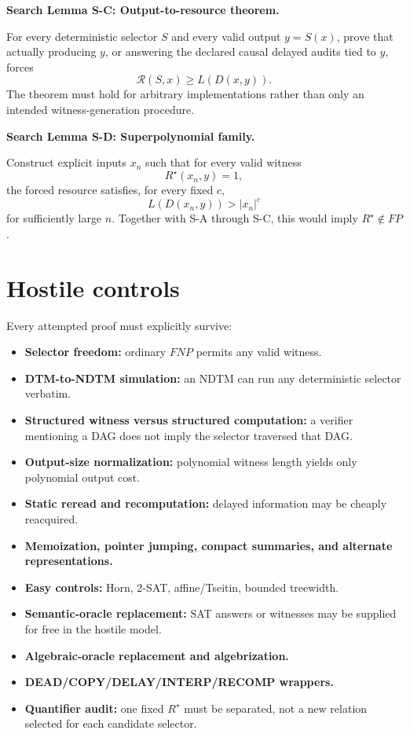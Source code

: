 \documentclass[11pt]{article}
\begin{document}
\begin{candidatebox}
\textbf{Search Lemma S-C: Output-to-resource theorem.}

For every deterministic selector \(S\) and every valid output \(y=S(x)\), prove that actually
producing \(y\), or answering the declared causal delayed audits tied to \(y\), forces
\[
\mathcal R(S,x)\ge L(D(x,y)).
\]
The theorem must hold for arbitrary implementations rather than only an intended witness-generation
procedure.
\end{candidatebox}

\begin{candidatebox}
\textbf{Search Lemma S-D: Superpolynomial family.}

Construct explicit inputs \(x_n\) such that for every valid witness
\[
R^\star(x_n,y)=1,
\]
the forced resource satisfies, for every fixed \(c\),
\[
L(D(x_n,y))>|x_n|^c
\]
for sufficiently large \(n\). Together with S-A through S-C, this would imply \(R^\star\notin FP\).
\end{candidatebox}

\section{Hostile controls}

Every attempted proof must explicitly survive:
\begin{itemize}
\item[] \textbf{Selector freedom:} ordinary \(FNP\) permits any valid witness.
\item[] \textbf{DTM-to-NDTM simulation:} an NDTM can run any deterministic selector verbatim.
\item[] \textbf{Structured witness versus structured computation:} a verifier mentioning a DAG does
not imply the selector traversed that DAG.
\item[] \textbf{Output-size normalization:} polynomial witness length yields only polynomial output cost.
\item[] \textbf{Static reread and recomputation:} delayed information may be cheaply reacquired.
\item[] \textbf{Memoization, pointer jumping, compact summaries, and alternate representations.}
\item[] \textbf{Easy controls:} Horn, 2-SAT, affine/Tseitin, bounded treewidth.
\item[] \textbf{Semantic-oracle replacement:} SAT answers or witnesses may be supplied for free in the
hostile model.
\item[] \textbf{Algebraic-oracle replacement and algebrization.}
\item[] \textbf{DEAD/COPY/DELAY/INTERP/RECOMP wrappers.}
\item[] \textbf{Quantifier audit:} one fixed \(R^\star\) must be separated, not a new relation selected
for each candidate selector.
\end{itemize}
\end{document}
